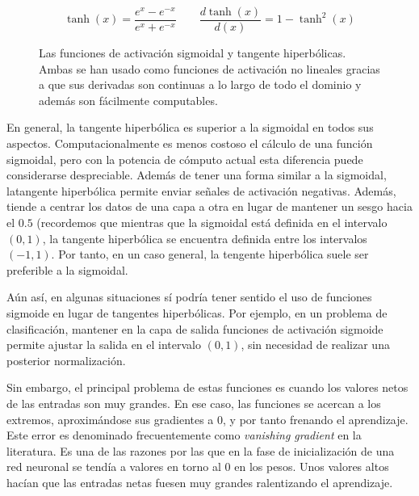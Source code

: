 \begin{equation}
\tanh(x) = \frac{e^x - e^{-x}}{e^x+e^{-x}} \qquad
\frac{d\tanh (x)}{d(x)} = 1 - \tanh^2(x)
\label{eq:tanh}
\end{equation}

\begin{figure}[!b]
	\centering
	\qquad
	\caption[Funciones de activación: sigmoidal y tangente hiperbólica.]{Las funciones de activación sigmoidal y tangente hiperbólicas. Ambas se han usado como funciones de activación no lineales gracias a que sus derivadas son continuas a lo largo de todo el dominio y además son fácilmente computables.}
	\label{fig:sig-and-tanh}
\end{figure}

En general, la tangente hiperbólica es superior a la sigmoidal en todos sus aspectos. Computacionalmente es menos costoso el cálculo de una función sigmoidal, pero con la potencia de cómputo actual esta diferencia puede considerarse despreciable. Además de tener una forma similar a la sigmoidal, latangente hiperbólica permite enviar señales de activación negativas. Además, tiende a centrar los datos de una capa a otra en lugar de mantener un sesgo hacia el $0.5$ (recordemos que mientras que la sigmoidal está definida en el intervalo $(0, 1)$, la tangente hiperbólica se encuentra definida entre los intervalos $(-1, 1)$. Por tanto, en un caso general, la tengente hiperbólica suele ser preferible a la sigmoidal.

Aún así, en algunas situaciones sí podría tener sentido el uso de funciones sigmoide en lugar de tangentes hiperbólicas. Por ejemplo, en un problema de clasificación, mantener en la capa de salida funciones de activación sigmoide permite ajustar la salida en el intervalo $(0, 1)$, sin necesidad de realizar una posterior normalización.

Sin embargo, el principal problema de estas funciones es cuando los valores netos de las entradas son muy grandes. En ese caso, las funciones se acercan a los extremos, aproximándose sus gradientes a 0, y por tanto frenando el aprendizaje. Este error es denominado frecuentemente como \textit{vanishing gradient} en la literatura. Es una de las razones por las que en la fase de inicialización de una red neuronal se tendía a valores en torno al 0 en los pesos. Unos valores altos hacían que las entradas netas fuesen muy grandes ralentizando el aprendizaje.

